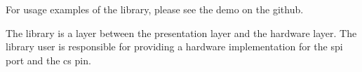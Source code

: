 For usage examples of the library, please see the demo on the github.

The library is a layer between the presentation layer and the hardware layer. The library user is responsible for providing a hardware implementation for the spi port and the cs pin. 